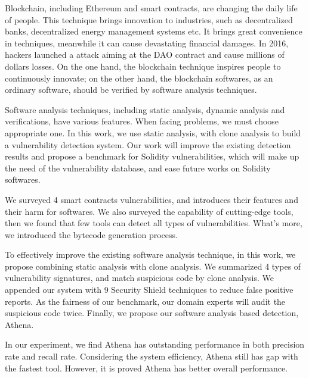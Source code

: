 \begin{enabstract}
Blockchain, including Ethereum and smart contracts, are changing the daily life of people. This technique brings innovation to industries, such as decentralized banks, decentralized energy management systems etc. It brings great convenience in techniques, meanwhile it can cause devastating financial damages. In 2016, hackers launched a attack aiming at the DAO contract and cause millions of dollars losses. On the one hand, the blockchain technique inspires people to continuously innovate; on the other hand, the blockchain softwares, as an ordinary software, should be verified by software analysis techniques.

Software analysis techniques, including static analysis, dynamic analysis and verifications, have various features. When facing problems, we must choose appropriate one. In this work, we use static analysis, with clone analysis to build a vulnerability detection system. Our work will improve the existing detection results and propose a benchmark for Solidity vulnerabilities, which will make up the need of the vulnerability database, and ease future works on Solidity softwares.

We surveyed 4 smart contracts vulnerabilities, and introduces their features and their harm for softwares. We also surveyed the capability of cutting-edge tools, then we found that few tools can detect all types of vulnerabilities. What's more, we introduced the bytecode generation process.

To effectively improve the existing software analysis technique, in this work, we propose combining static analysis with clone analysis. We summarized 4 types of vulnerability signatures, and match suspicious code by clone analysis. We appended our system with 9 Security Shield techniques to reduce false positive reports. As the fairness of our benchmark, our domain experts will audit the suspicious code twice. Finally, we propose our software analysis based detection, Athena.

In our experiment, we find Athena has outstanding performance in both precision rate and recall rate. Considering the system efficiency, Athena still has gap with the fastest tool. However, it is proved Athena has better overall performance. 

\end{enabstract}
